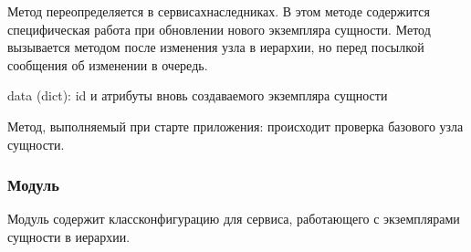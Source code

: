 \documentclass[a4paper,10pt,russian]{sphinxmanual}
\begin{document}
\begin{fulllineitems}
\begin{fulllineitems}
\begin{description}
\end{description}

\end{fulllineitems}



\begin{fulllineitems}

\pysigstartsignatures
{}
\pysigstopsignatures
\sphinxAtStartPar
Метод переопределяется в сервисах\sphinxhyphen{}наследниках.
В этом методе содержится специфическая работа при обновлении
нового экземпляра сущности.
Метод вызывается методом  после изменения узла в иерархии,
но перед посылкой сообщения об изменении в очередь.
\begin{description}
\sphinxAtStartPar
data (dict): id и атрибуты вновь создаваемого экземпляра сущности

\end{description}

\end{fulllineitems}



\begin{fulllineitems}

\pysigstartsignatures
{}
\pysigstopsignatures
\sphinxAtStartPar
Метод, выполняемый при старте приложения:
происходит проверка базового узла сущности.

\end{fulllineitems}


\end{fulllineitems}



\subsubsection{Модуль }
\label{\detokenize{developer:model-crud-settings}}
\sphinxAtStartPar
Модуль содержит класс\sphinxhyphen{}конфигурацию для сервиса, работающего с экземплярами
сущности в иерархии.
\end{document}
